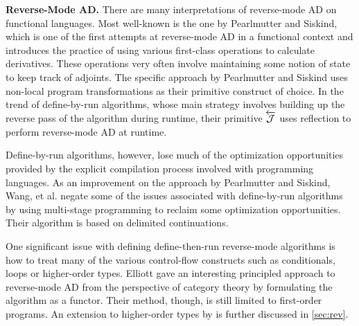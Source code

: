 \textbf{Reverse-Mode AD.} There are many interpretations of reverse-mode AD on functional languages.
Most well-known is the one by Pearlmutter and Siskind\cite{PearlmutterSiskind2008}, which is one of the first attempts at reverse-mode AD in a functional context and introduces the practice of using various first-class operations to calculate derivatives.
These operations very often involve maintaining some notion of state to keep track of adjoints.
The specific approach by Pearlmutter and Siskind uses non-local program transformations as their primitive construct of choice.
In the trend of define-by-run algorithms, whose main strategy involves building up the reverse pass of the algorithm during runtime, their primitive $\overleftarrow{\mathcal{J}}$ uses reflection to perform reverse-mode AD at runtime.

Define-by-run algorithms, however, lose much of the optimization opportunities provided by the explicit compilation process involved with programming languages.
As an improvement on the approach by Pearlmutter and Siskind, Wang, et al.\cite{ShiftReset:Backprop} negate some of the issues associated with define-by-run algorithms by using multi-stage programming to reclaim some optimization opportunities. Their algorithm is based on delimited continuations.


One significant issue with defining define-then-run reverse-mode algorithms is how to treat many of the various control-flow constructs such as conditionals, loops or higher-order types.
Elliott\cite{Elliott-2018-ad-icfp} gave an interesting principled approach to reverse-mode AD from the perspective of category theory by formulating the algorithm as a functor.
Their method, though, is still limited to first-order programs.
An extension to higher-order types by \Vakar{}\cite{vkr2020reverse} is further discussed in \cref{sec:rev}.


